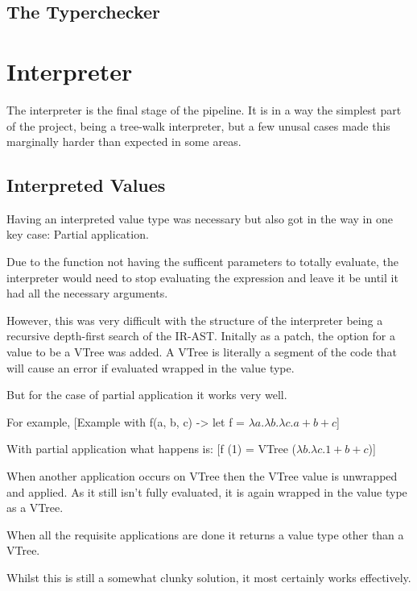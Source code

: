 \documentclass{l4proj}
\begin{document}
\subsection{The Typerchecker}


\section{Interpreter}

The interpreter is the final stage of the pipeline.
It is in a way the simplest part of the project, being a tree-walk interpreter, but a few unusal cases made this marginally harder than expected in some areas.

\subsection{Interpreted Values}

Having an interpreted value type was necessary but also got in the way in one key case: Partial application.

Due to the function not having the sufficent parameters to totally evaluate, the interpreter would need to stop evaluating the expression and leave it be until it had all the necessary arguments.

However, this was very difficult with the structure of the interpreter being a recursive depth-first search of the IR-AST.
Initally as a patch, the option for a value to be a VTree was added.
A VTree is literally a segment of the code that will cause an error if evaluated wrapped in the value type.

But for the case of partial application it works very well.

For example, [Example with f(a, b, c) -> let f = $\lambda a. \lambda b. \lambda c. a + b + c$]

With partial application what happens is: [f (1) = VTree ($\lambda b. \lambda c. 1 + b + c$)]

When another application occurs on VTree then the VTree value is unwrapped and applied.
As it still isn't fully evaluated, it is again wrapped in the value type as a VTree.

When all the requisite applications are done it returns a value type other than a VTree.

Whilst this is still a somewhat clunky solution, it most certainly works effectively.
\end{document}
